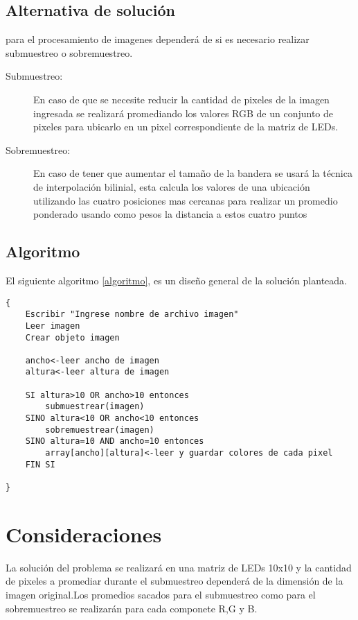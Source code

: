 \documentclass{article}
\begin{document}
\subsection{Alternativa de solución}

para el procesamiento de imagenes dependerá de si es necesario realizar submuestreo o sobremuestreo.

\begin{description}
   \item[Submuestreo:] En caso de que se necesite reducir la cantidad de pixeles de la imagen ingresada se realizará promediando los valores RGB de un conjunto de pixeles para ubicarlo en un pixel correspondiente de la matriz de LEDs.
   \item[Sobremuestreo:] En caso de tener que aumentar el tamaño de la bandera se usará la técnica de interpolación bilinial, esta calcula los valores de una ubicación utilizando las cuatro posiciones mas cercanas para realizar un promedio ponderado usando como pesos la distancia a estos cuatro puntos
\end{description}


\subsection{Algoritmo}
%
El siguiente algoritmo \ref{algoritmo}, es un diseño general de la solución planteada. 


\begin{lstlisting}[label=algoritmo]
{
    Escribir "Ingrese nombre de archivo imagen"
    Leer imagen
    Crear objeto imagen
    
    ancho<-leer ancho de imagen
    altura<-leer altura de imagen
    
    SI altura>10 OR ancho>10 entonces
        submuestrear(imagen)
    SINO altura<10 OR ancho<10 entonces
        sobremuestrear(imagen)
    SINO altura=10 AND ancho=10 entonces
        array[ancho][altura]<-leer y guardar colores de cada pixel 
    FIN SI

}

\end{lstlisting}

\section{Consideraciones} \label{Consideraciones}
La solución del problema se realizará en una matriz de LEDs 10x10 y la cantidad de pixeles a promediar durante el submuestreo dependerá de la dimensión de la imagen original.Los promedios sacados para el submuestreo como para el sobremuestreo se realizarán para cada componete R,G y B.
\end{document}
